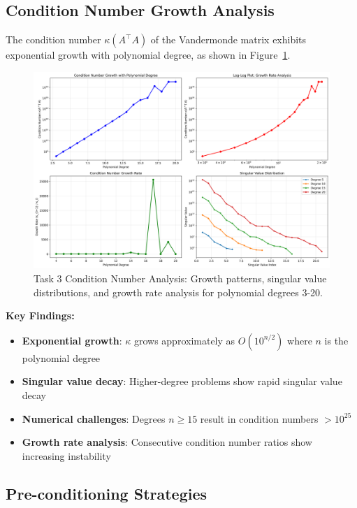 \documentclass[11pt,a4paper]{article}
\begin{document}
\subsection{Condition Number Growth Analysis}

The condition number $\kappa(A^\top A)$ of the Vandermonde matrix exhibits exponential growth with polynomial degree, as shown in Figure~\ref{fig:task3_condition}.

\begin{figure}[h]
\centering
\includegraphics[width=\textwidth]{../results/plots/task3_condition_analysis.png}
\caption{Task 3 Condition Number Analysis: Growth patterns, singular value distributions, and growth rate analysis for polynomial degrees 3-20.}
\label{fig:task3_condition}
\end{figure}

\textbf{Key Findings:}
\begin{itemize}
    \item \textbf{Exponential growth}: $\kappa$ grows approximately as $O(10^{n/2})$ where $n$ is the polynomial degree
    \item \textbf{Singular value decay}: Higher-degree problems show rapid singular value decay
    \item \textbf{Numerical challenges}: Degrees $n \geq 15$ result in condition numbers $> 10^{25}$
    \item \textbf{Growth rate analysis}: Consecutive condition number ratios show increasing instability
\end{itemize}

\subsection{Pre-conditioning Strategies}
\end{document}

